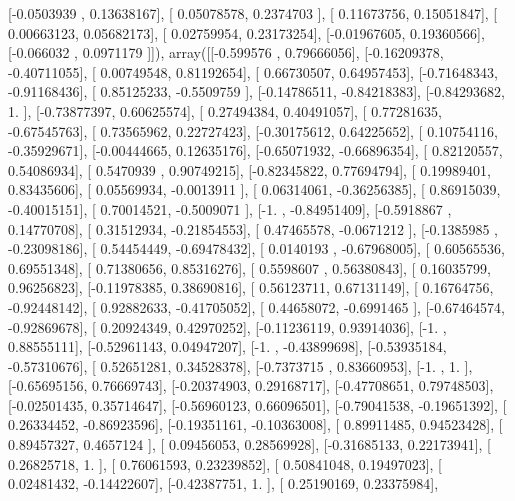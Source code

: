 \documentclass{article}
\begin{document}
       [-0.0503939 ,  0.13638167],
       [ 0.05078578,  0.2374703 ],
       [ 0.11673756,  0.15051847],
       [ 0.00663123,  0.05682173],
       [ 0.02759954,  0.23173254],
       [-0.01967605,  0.19360566],
       [-0.066032  ,  0.0971179 ]]), array([[-0.599576  ,  0.79666056],
       [-0.16209378, -0.40711055],
       [ 0.00749548,  0.81192654],
       [ 0.66730507,  0.64957453],
       [-0.71648343, -0.91168436],
       [ 0.85125233, -0.5509759 ],
       [-0.14786511, -0.84218383],
       [-0.84293682,  1.        ],
       [-0.73877397,  0.60625574],
       [ 0.27494384,  0.40491057],
       [ 0.77281635, -0.67545763],
       [ 0.73565962,  0.22727423],
       [-0.30175612,  0.64225652],
       [ 0.10754116, -0.35929671],
       [-0.00444665,  0.12635176],
       [-0.65071932, -0.66896354],
       [ 0.82120557,  0.54086934],
       [ 0.5470939 ,  0.90749215],
       [-0.82345822,  0.77694794],
       [ 0.19989401,  0.83435606],
       [ 0.05569934, -0.0013911 ],
       [ 0.06314061, -0.36256385],
       [ 0.86915039, -0.40015151],
       [ 0.70014521, -0.5009071 ],
       [-1.        , -0.84951409],
       [-0.5918867 ,  0.14770708],
       [ 0.31512934, -0.21854553],
       [ 0.47465578, -0.0671212 ],
       [-0.1385985 , -0.23098186],
       [ 0.54454449, -0.69478432],
       [ 0.0140193 , -0.67968005],
       [ 0.60565536,  0.69551348],
       [ 0.71380656,  0.85316276],
       [ 0.5598607 ,  0.56380843],
       [ 0.16035799,  0.96256823],
       [-0.11978385,  0.38690816],
       [ 0.56123711,  0.67131149],
       [ 0.16764756, -0.92448142],
       [ 0.92882633, -0.41705052],
       [ 0.44658072, -0.6991465 ],
       [-0.67464574, -0.92869678],
       [ 0.20924349,  0.42970252],
       [-0.11236119,  0.93914036],
       [-1.        ,  0.88555111],
       [-0.52961143,  0.04947207],
       [-1.        , -0.43899698],
       [-0.53935184, -0.57310676],
       [ 0.52651281,  0.34528378],
       [-0.7373715 ,  0.83660953],
       [-1.        ,  1.        ],
       [-0.65695156,  0.76669743],
       [-0.20374903,  0.29168717],
       [-0.47708651,  0.79748503],
       [-0.02501435,  0.35714647],
       [-0.56960123,  0.66096501],
       [-0.79041538, -0.19651392],
       [ 0.26334452, -0.86923596],
       [-0.19351161, -0.10363008],
       [ 0.89911485,  0.94523428],
       [ 0.89457327,  0.4657124 ],
       [ 0.09456053,  0.28569928],
       [-0.31685133,  0.22173941],
       [ 0.26825718,  1.        ],
       [ 0.76061593,  0.23239852],
       [ 0.50841048,  0.19497023],
       [ 0.02481432, -0.14422607],
       [-0.42387751,  1.        ],
       [ 0.25190169,  0.23375984],
\end{document}
